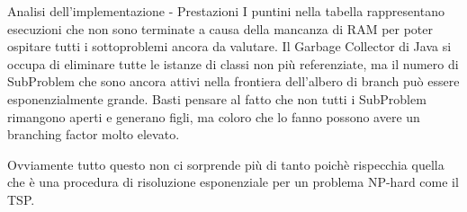 \documentclass[10pt]{beamer}
\begin{document}
    \begin{frame}{Analisi dell'implementazione - Prestazioni}
        I puntini nella tabella rappresentano esecuzioni che non sono terminate a causa della mancanza di RAM per poter ospitare tutti i sottoproblemi ancora da valutare.
        Il {\selectfont Garbage Collector} di Java si occupa di eliminare tutte le istanze di classi non più referenziate, ma il numero di {\selectfont SubProblem} che sono ancora attivi nella frontiera dell'albero di branch può essere esponenzialmente grande.
        Basti pensare al fatto che non tutti i {\selectfont SubProblem} rimangono aperti e generano figli, ma coloro che lo fanno possono avere un branching factor molto elevato.


        Ovviamente tutto questo non ci sorprende più di tanto poichè rispecchia quella che è una procedura di risoluzione esponenziale per un problema NP-hard come il TSP\@.
    \end{frame}
\end{document}
